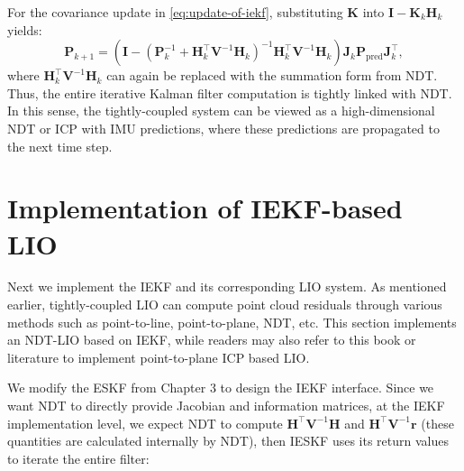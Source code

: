 For the covariance update in \eqref{eq:update-of-iekf}, substituting \(\mathbf{K}\) into \(\mathbf{I} - \mathbf{K}_k \mathbf{H}_k\) yields:  
\begin{equation}\label{key}  
	\mathbf{P}_{k+1} = (\mathbf{I} - (\mathbf{P}_k^{-1} + \mathbf{H}_k^\top \mathbf{V}^{-1} \mathbf{H}_k)^{-1} \mathbf{H}_k^\top \mathbf{V}^{-1} \mathbf{H}_k) \mathbf{J}_k \mathbf{P}_{\mathrm{pred}} \mathbf{J}_k^\top,  
\end{equation}  
where \(\mathbf{H}_k^\top \mathbf{V}^{-1} \mathbf{H}_k\) can again be replaced with the summation form from NDT. Thus, the entire iterative Kalman filter computation is tightly linked with NDT. In this sense, the tightly-coupled system can be viewed as a high-dimensional NDT or ICP with IMU predictions, where these predictions are propagated to the next time step.
\
\section{Implementation of IEKF-based LIO}
\label{sec:iekf-lio}

Next we implement the IEKF and its corresponding LIO system. As mentioned earlier, tightly-coupled LIO can compute point cloud residuals through various methods such as point-to-line, point-to-plane, NDT, etc. This section implements an NDT-LIO based on IEKF, while readers may also refer to this book or literature \cite{Bai2022,Xu2021,xu2021fast} to implement point-to-plane ICP based LIO.

We modify the ESKF from Chapter 3 to design the IEKF interface. Since we want NDT to directly provide Jacobian and information matrices, at the IEKF implementation level, we expect NDT to compute $\mathbf{H}^\top \mathbf{V}^{-1} \mathbf{H}$ and $\mathbf{H}^\top \mathbf{V}^{-1} \mathbf{r}$ (these quantities are calculated internally by NDT), then IESKF uses its return values to iterate the entire filter:

